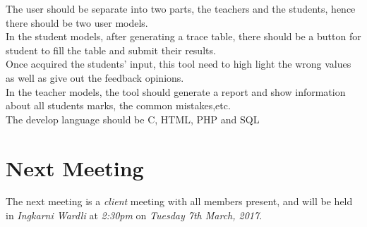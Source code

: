 \documentclass[11pt, a4paper]{article}
\begin{document}
The user should be separate into two parts, the teachers and the students, hence there should be two user models.\\


In the student models, after generating a trace table, there should be a button for student to fill the table and submit their results.\\


Once acquired the students' input, this tool need to high light the wrong values as well as give out the feedback opinions.\\


In the teacher models, the tool should generate a report and show information about all students marks, the common mistakes,etc.\\


The develop language should be C, HTML, PHP and SQL


\section{Next Meeting}
The next meeting is a \emph{client} meeting with all members present, and will be held in \emph{Ingkarni Wardli } at \emph{2:30pm} on \emph{Tuesday 7th March, 2017}.
\end{document}
